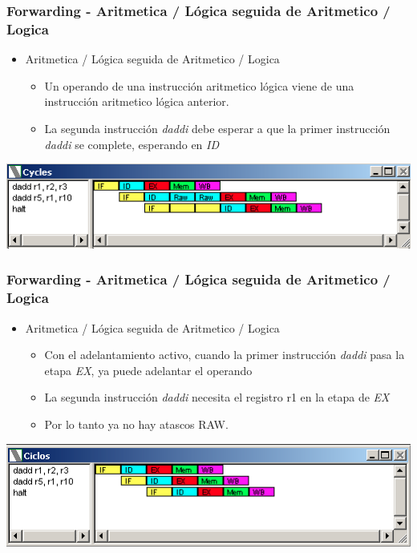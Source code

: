 \documentclass{beamer}
\begin{document}
\begin{frame}[fragile]
\frametitle{Forwarding - Aritmetica / Lógica seguida de Aritmetico / Logica}
\begin{itemize}
\item Aritmetica / Lógica seguida de Aritmetico / Logica
\begin{itemize}
\item Un operando de una instrucción aritmetico lógica viene de una instrucción aritmetico lógica anterior.
\item La segunda  instrucción \emph{daddi} debe esperar a que la primer instrucción \emph{daddi} se complete, esperando en \emph{ID}
\end{itemize}
\end{itemize}
\includegraphics[scale=0.45]{forwarding-5.png}
\end{frame}

\begin{frame}[fragile]
\frametitle{Forwarding - Aritmetica / Lógica seguida de Aritmetico / Logica}
\begin{itemize}
\item Aritmetica / Lógica seguida de Aritmetico / Logica
\begin{itemize}
\item Con el adelantamiento activo, cuando la primer instrucción \emph{daddi} pasa la etapa \emph{EX}, ya puede adelantar el operando
\item La segunda instrucción \emph{daddi} necesita el registro r1 en la etapa de \emph{EX}
\item Por lo tanto ya no hay atascos RAW.
\end{itemize}
\end{itemize}
\includegraphics[scale=0.45]{forwarding-5-aritmetica-aritmetica.png}
\end{frame}
\end{document}
